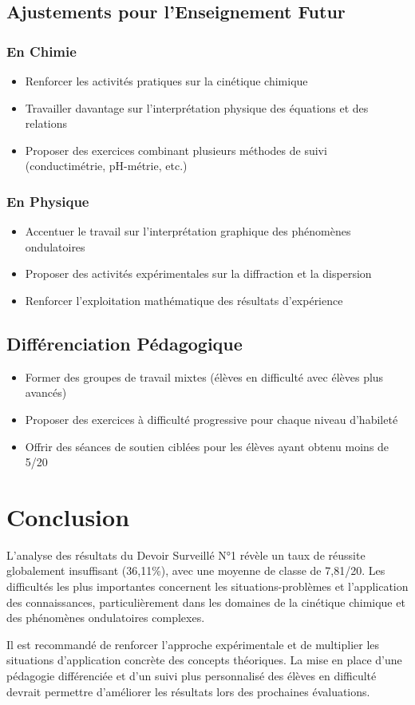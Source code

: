 \documentclass[12pt]{article}
\begin{document}
\subsection{Ajustements pour l'Enseignement Futur}

\subsubsection{En Chimie}
\begin{itemize}
\item Renforcer les activités pratiques sur la cinétique chimique
\item Travailler davantage sur l'interprétation physique des équations et des relations
\item Proposer des exercices combinant plusieurs méthodes de suivi (conductimétrie, pH-métrie, etc.)
\end{itemize}

\subsubsection{En Physique}
\begin{itemize}
\item Accentuer le travail sur l'interprétation graphique des phénomènes ondulatoires
\item Proposer des activités expérimentales sur la diffraction et la dispersion
\item Renforcer l'exploitation mathématique des résultats d'expérience
\end{itemize}

\subsection{Différenciation Pédagogique}
\begin{itemize}
\item Former des groupes de travail mixtes (élèves en difficulté avec élèves plus avancés)
\item Proposer des exercices à difficulté progressive pour chaque niveau d'habileté
\item Offrir des séances de soutien ciblées pour les élèves ayant obtenu moins de 5/20
\end{itemize}

\section{Conclusion}

L'analyse des résultats du Devoir Surveillé N°1 révèle un taux de réussite globalement insuffisant (36,11\%), avec une moyenne de classe de 7,81/20. Les difficultés les plus importantes concernent les situations-problèmes et l'application des connaissances, particulièrement dans les domaines de la cinétique chimique et des phénomènes ondulatoires complexes.

Il est recommandé de renforcer l'approche expérimentale et de multiplier les situations d'application concrète des concepts théoriques. La mise en place d'une pédagogie différenciée et d'un suivi plus personnalisé des élèves en difficulté devrait permettre d'améliorer les résultats lors des prochaines évaluations.
\end{document}
